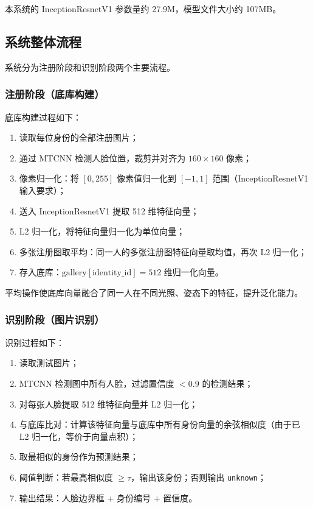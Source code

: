 \documentclass[12pt, a4paper]{article}
\begin{document}
本系统的 InceptionResnetV1 参数量约 27.9M，模型文件大小约 107MB。

\subsection{系统整体流程}

系统分为注册阶段和识别阶段两个主要流程。

\subsubsection{注册阶段（底库构建）}

底库构建过程如下：
\begin{enumerate}
  \item 读取每位身份的全部注册图片；
  \item 通过 MTCNN 检测人脸位置，裁剪并对齐为 $160 \times 160$ 像素；
  \item 像素归一化：将 $[0, 255]$ 像素值归一化到 $[-1, 1]$ 范围（InceptionResnetV1 输入要求）；
  \item 送入 InceptionResnetV1 提取 512 维特征向量；
  \item L2 归一化，将特征向量归一化为单位向量；
  \item 多张注册图取平均：同一人的多张注册图特征向量取均值，再次 L2 归一化；
  \item 存入底库：$\text{gallery}[\text{identity\_id}] = 512$ 维归一化向量。
\end{enumerate}

平均操作使底库向量融合了同一人在不同光照、姿态下的特征，提升泛化能力。

\subsubsection{识别阶段（图片识别）}

识别过程如下：
\begin{enumerate}
  \item 读取测试图片；
  \item MTCNN 检测图中所有人脸，过滤置信度 $< 0.9$ 的检测结果；
  \item 对每张人脸提取 512 维特征向量并 L2 归一化；
  \item 与底库比对：计算该特征向量与底库中所有身份向量的余弦相似度（由于已 L2 归一化，等价于向量点积）；
  \item 取最相似的身份作为预测结果；
  \item 阈值判断：若最高相似度 $\geq \tau$，输出该身份；否则输出 \texttt{unknown}；
  \item 输出结果：人脸边界框 + 身份编号 + 置信度。
\end{enumerate}
\end{document}
